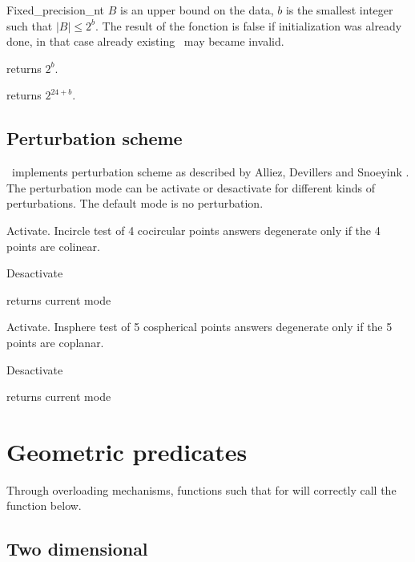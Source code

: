 \begin{ccClass} {Fixed_precision_nt}
{$B$ is an upper bound on the data, $b$ is the smallest integer such that 
$|B|\leq 2^b$. The result of the fonction is false if initialization was
already done, in that case already existing \ccClassName\ may became invalid.}

{returns $2^b$.}

{returns $2^{24+b}$.}

\subsection{Perturbation scheme}

\ccClassName\ implements perturbation scheme as described by
Alliez, Devillers and Snoeyink
\cite{ads-rdppw-98}.
The perturbation mode can be activate or desactivate for different kinds
of perturbations. The default mode is no perturbation.

{Activate. Incircle test of 4 cocircular points answers degenerate only if
the 4 points are colinear.}

{Desactivate}

{returns current mode}

{Activate. Insphere test of 5 cospherical points answers degenerate only if
the 5 points are coplanar.}

{Desactivate}

{returns current mode}

\section{Geometric predicates}

Through overloading mechanisms, functions such that
 for 
will correctly call the function below.


\subsection{Two dimensional}


\end{ccClass}
